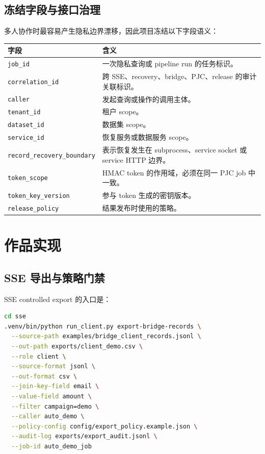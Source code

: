 \documentclass[UTF8,a4paper,12pt,oneside]{ctexrep}
\begin{document}
\section{冻结字段与接口治理}

多人协作时最容易产生隐私边界漂移，因此项目冻结以下字段语义：

\begin{center}
\begin{tabularx}{0.95\textwidth}{lX}
\toprule
\textbf{字段} & \textbf{含义} \\
\midrule
\texttt{job\_id} & 一次隐私查询或 pipeline run 的任务标识。 \\
\texttt{correlation\_id} & 跨 SSE、recovery、bridge、PJC、release 的审计关联标识。 \\
\texttt{caller} & 发起查询或操作的调用主体。 \\
\texttt{tenant\_id} & 租户 scope。 \\
\texttt{dataset\_id} & 数据集 scope。 \\
\texttt{service\_id} & 恢复服务或数据服务 scope。 \\
\texttt{record\_recovery\_boundary} & 表示恢复发生在 subprocess、service socket 或 service HTTP 边界。 \\
\texttt{token\_scope} & HMAC token 的作用域，必须在同一 PJC job 中一致。 \\
\texttt{token\_key\_version} & 参与 token 生成的密钥版本。 \\
\texttt{release\_policy} & 结果发布时使用的策略。 \\
\bottomrule
\end{tabularx}
\end{center}

\chapter{作品实现}

\section{SSE 导出与策略门禁}

SSE controlled export 的入口是：

\begin{lstlisting}[language=bash]
cd sse
.venv/bin/python run_client.py export-bridge-records \
  --source-path examples/bridge_client_records.jsonl \
  --out-path exports/client_demo.csv \
  --role client \
  --source-format jsonl \
  --out-format csv \
  --join-key-field email \
  --value-field amount \
  --filter campaign=demo \
  --caller auto_demo \
  --policy-config config/export_policy.example.json \
  --audit-log exports/export_audit.jsonl \
  --job-id auto_demo_job
\end{lstlisting}
\end{document}
